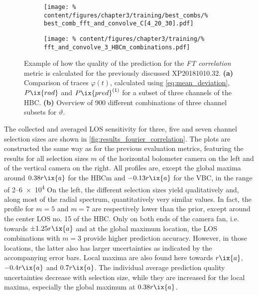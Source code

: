             \begin{figure}[t]%
                \centering%
                \begin{subfigure}{0.43\textwidth}%
                    \texttt{[image: \%
                        content/figures/chapter3/training/best\_combs/\%
                        best\_comb\_fft\_and\_convolve\_C[4\_20\_30].pdf]}%
                    \caption{}%
                \end{subfigure}%
                \hfill%
                \begin{subfigure}{0.47\textwidth}%
                    \texttt{[image: \%
                        content/figures/chapter3/training/\%
                        fft\_and\_convolve\_3\_HBCm\_combinations.pdf]}%
                    \caption{}%
                \end{subfigure}%
                \caption{Example of how the quality of the prediction for the \textit{FT correlation} metric is calculated for the previously discussed XP20181010.32. \textbf{(a)} Comparison of traces $\varphi\left(t\right)$, calculated using \cref{eq:mean_deviation}, $P\ix{rad}$ and $P\ix{pred}^{\left(1\right)}$ for a subset of three channels of the HBC. \textbf{(b)} Overview of 900 different combinations of three channel subsets for $\vartheta$.}\label{fig:fourier_correlation}%
            \end{figure}%
%
            The collected and averaged LOS sensitivity for three, five and seven channel selection sizes are shown in \cref{fig:results_fourier_correlation}. The plots are constructed the same way as for the previous evaluation metrics, featuring the results for all selection sizes $m$ of the horizontal bolometer camera on the left and of the vertical camera on the right. All profiles are, except the global maxima around $0.38r\ix{a}$ for the HBCm and $-0.13r\ix{a}$ for the VBC, in the range of \SIrange{2}{6e4}{\arbitraryunit} On the left, the different selection sizes yield qualitatively and, along most of the radial spectrum, quantitatively very similar values. In fact, the profile for $m=5$ and $m=7$ are respectively lower than the prior, except around the center LOS no. 15 of the HBC. Only on both ends of the camera fan, i.e. towards $\pm1.25r\ix{a}$ and at the global maximum location, the LOS combinations with $m=3$ provide higher prediction accuracy. However, in those locations, the latter also has larger uncertainties as indicated by the accompanying error bars. Local maxima are also found here towards $r\ix{a}$, $-0.4r\ix{a}$ and $0.7r\ix{a}$. The individual average prediction quality uncertainties decrease with selection size, while they are increased for the local maxima, especially the global maximum at $0.38r\ix{a}$.\\%

